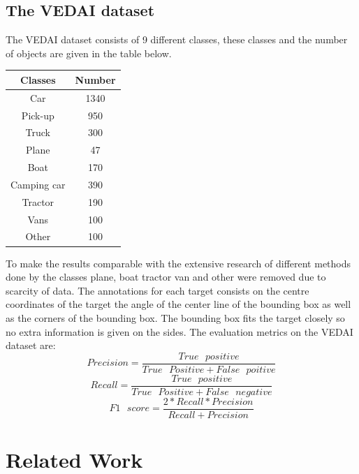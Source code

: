\documentclass[a4paper,11pt]{article}
\begin{document}
\subsection{The VEDAI dataset}
The VEDAI dataset \cite{razakarivony_vehicle_2015} consists of 9 different classes, these classes and the number of objects are given in the table below.\begin{center}
\begin{tabular}{|c|c|}
\hline
\textbf{Classes} & \textbf{Number}\\
\hline
Car & 1340\\
Pick-up & 950\\
Truck & 300\\
Plane & 47\\
Boat & 170\\
Camping car & 390\\
Tractor & 190\\
Vans & 100\\
Other & 100\\
\hline
\end{tabular}
\end{center}
To make the results comparable with the extensive research of different methods done by \cite{zhong_robust_2017} the classes plane, boat tractor van and other were removed due to scarcity of data. The annotations for each target consists on the centre coordinates of the target the angle of the center line of the bounding box as well as the corners of the bounding box. The bounding box fits the target closely so no extra information is given on the sides. The evaluation metrics on the VEDAI dataset are:\\
\begin{equation}\label{eq:precision}
Precision=\frac{True\textit{ }positive}{True\textit{ }Positive+False\textit{ }poitive}
\end{equation}
\begin{equation}\label{eq:recall}
Recall=\frac{True\textit{ }positive}{True\textit{ }Positive+False\textit{ }negative}
\end{equation}
\begin{equation}\label{eq:f1}
F1\textit{ }score=\frac{2*Recall*Precision}{Recall+Precision}
\end{equation}
\section{Related Work}



\end{document}
